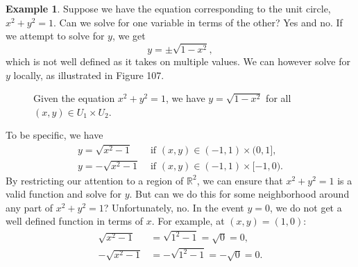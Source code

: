 \documentclass{article}
\newcommand{\R}{\mathbb{R}}
\theoremstyle{definition}
\newtheorem{example}{Example}[section]
\begin{document}
\begin{example}
	Suppose we have the equation corresponding to the unit circle, $ x^2 + y^2 = 1 $. Can we solve for one variable in terms of the other? Yes and no. If we attempt to solve for $ y $, we get 
	$$ y=\pm \sqrt{1-x^2},$$ which is not well defined as it takes on multiple values. We can however solve for $ y $ locally, as illustrated in Figure 107. 
		\begin{figure}[h!]
		\centering
		\caption{Given the equation $ x^2+y^2=1 $, we have $ y=\sqrt{1-x^2} $ for all $ (x,y)\in U_1\times U_2 $. }
	\end{figure}
	To be specific, we have 
	\begin{align*}
		y=\sqrt{x^2-1}&\text{ if }(x,y)\in (-1,1)\times(0,1],\\
		y=-\sqrt{x^2-1}&\text{ if }(x,y)\in (-1,1)\times[-1,0).  
	\end{align*}
	By restricting our attention to a region of $ \R^2 $, we can ensure that $ x^2+y^2=1 $ is a valid function and solve for $ y $. But can we do this for some neighborhood around any part of $ x^2+y^2=1 $? Unfortunately, no. In the event $ y = 0 $, we do not get a well defined function in terms of $ x $. For example, at $ (x,y)=(1,0) $:
	\begin{align*}
	\sqrt{x^2-1} &= \sqrt{1^2 - 1}=\sqrt{0}=0,\\
	-\sqrt{x^2-1} &= -\sqrt{1^2 - 1}=-\sqrt{0}=0.
	\end{align*}	 
	

\end{example}
\end{document}
